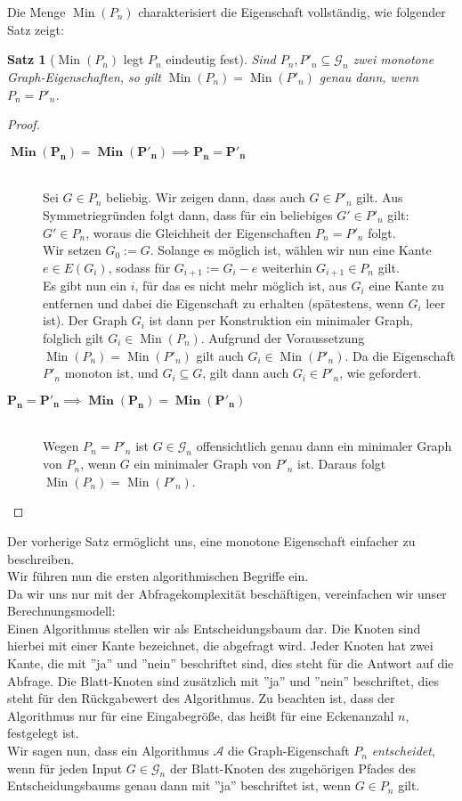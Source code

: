 \documentclass[a4paper]{scrreprt}
\newtheorem{Satz}{Satz}
\theoremstyle{definition}
\DeclareMathOperator\Min{Min}
\begin{document}
Die Menge $\Min(P_n)$ charakterisiert die
Eigenschaft vollständig, wie folgender Satz zeigt:

\begin{Satz}[$\Min(P_n)$ legt $P_n$ eindeutig fest]
Sind $P_n, P'_n \subseteq \mathcal{G}_n$ zwei monotone 
Graph-Eigenschaften, so gilt
$\Min(P_n) = \Min(P'_n)$ genau dann, wenn $P_n = P'_n$.
\end{Satz}
\begin{proof} \hfill
\begin{description}
\item[$\boldsymbol{\Min(P_n) = \Min(P'_n) \implies P_n = P'_n}$]
\hfill \\
Sei $G \in P_n$ beliebig. Wir zeigen dann, dass auch $G \in P'_n$
gilt. Aus Symmetriegründen folgt dann, dass für ein beliebiges 
$G' \in P'_n$ gilt: $G' \in P_n$, woraus die Gleichheit der
Eigenschaften $P_n = P'_n$ folgt. \\
Wir setzen $G_0 := G$. Solange es möglich ist, wählen wir nun
eine Kante $e \in E(G_i)$, sodass für $G_{i+1} := G_i - e$  
weiterhin $G_{i+1} \in P_n$ gilt. \\
Es gibt nun ein $i$, für das es nicht mehr möglich ist,
aus $G_i$ eine Kante zu entfernen und dabei die Eigenschaft
zu erhalten (spätestens, wenn $G_i$ leer ist).
Der Graph $G_i$ ist dann per Konstruktion ein minimaler
Graph, folglich gilt $G_i \in \Min(P_n)$. Aufgrund der
Voraussetzung $\Min(P_n) = \Min(P'_n)$ gilt auch 
$G_i \in \Min(P'_n)$. Da die Eigenschaft $P'_n$ monoton ist,
und $G_i \subseteq G$, gilt dann auch $G_i \in P'_n$,
wie gefordert.
\item[$\boldsymbol{P_n = P'_n \implies \Min(P_n) = \Min(P'_n)}$]
\hfill \\
Wegen $P_n = P'_n$ ist $G \in \mathcal{G}_n$ offensichtlich
genau dann ein minimaler Graph von $P_n$, wenn $G$ ein 
minimaler Graph von $P'_n$ ist. Daraus folgt 
$\Min(P_n) = \Min(P'_n)$.
\end{description}
\end{proof}
Der vorherige Satz ermöglicht uns, eine
monotone Eigenschaft einfacher zu beschreiben. \\

Wir führen nun die ersten algorithmischen Begriffe ein. \\
Da wir uns nur mit der Abfragekomplexität beschäftigen,
vereinfachen wir unser Berechnungsmodell: \\
Einen Algorithmus stellen wir als Entscheidungsbaum dar.
Die Knoten sind hierbei mit einer Kante bezeichnet, die
abgefragt wird. Jeder Knoten hat zwei Kante, die mit
''ja'' und ''nein'' beschriftet sind, dies steht für
die Antwort auf die Abfrage. Die Blatt-Knoten sind
zusätzlich mit ''ja'' und ''nein'' beschriftet,
dies steht für den Rückgabewert des Algorithmus.
Zu beachten ist, dass der Algorithmus nur für eine
Eingabegröße, das heißt für eine Eckenanzahl $n$,
festgelegt ist.\\
Wir sagen nun, dass ein Algorithmus $\mathcal{A}$
die Graph-Eigenschaft $P_n$ \emph{entscheidet}, wenn
für jeden Input $G \in \mathcal{G}_n$ der Blatt-Knoten
des zugehörigen Pfades des Entscheidungsbaums genau
dann mit ''ja'' beschriftet ist, wenn $G \in P_n$ gilt.
\end{document}
